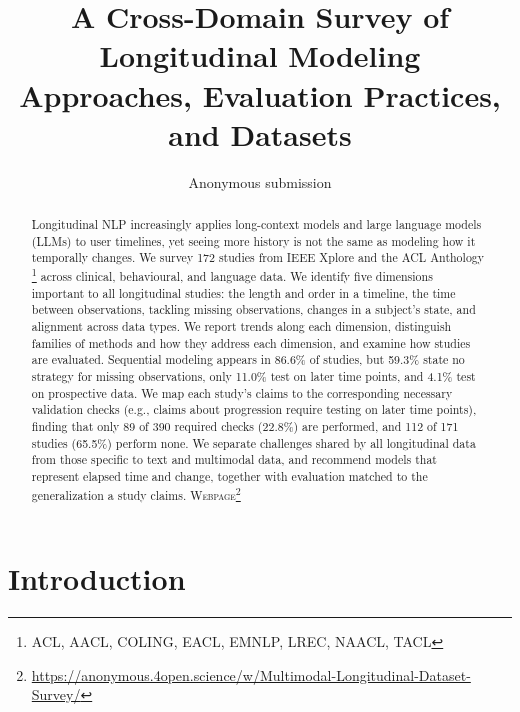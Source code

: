 \documentclass[11pt]{article}
\title{A Cross-Domain Survey of Longitudinal Modeling Approaches, Evaluation Practices, and Datasets}
\author{Anonymous submission}
\theoremstyle{plain}
\theoremstyle{definition}
\theoremstyle{remark}
\begin{document}
\maketitle
\begin{abstract}
Longitudinal NLP increasingly applies long-context models and large language models (LLMs) to user timelines, yet seeing more history is not the same as modeling how it temporally changes. We survey 172 studies from IEEE Xplore and the ACL Anthology \footnote{\small ACL, AACL, COLING, EACL, EMNLP, LREC, NAACL, TACL} across clinical, behavioural, and language data. We identify five dimensions important to all longitudinal studies: the length and order in a timeline, the time between observations, tackling missing observations, changes in a subject's state, and alignment across data types. We report trends along each dimension, distinguish families of methods and how they address each dimension, and examine how studies are evaluated. Sequential modeling appears in 86.6\% of studies, but 59.3\% state no strategy for missing observations, only 11.0\% test on later time points, and 4.1\% test on prospective data. We map each study's claims to the corresponding necessary validation checks (e.g., claims about progression require testing on later time points), finding that only 89 of 390 required checks (22.8\%) are performed, and 112 of 171 studies (65.5\%) perform none. We separate challenges shared by all longitudinal data from those specific to text and multimodal data, and recommend models that represent elapsed time and change, together with evaluation matched to the generalization a study claims. \textsc{Webpage}\footnote{\url{https://anonymous.4open.science/w/Multimodal-Longitudinal-Dataset-Survey/}}
\end{abstract}

\section{Introduction}
\label{sec:introduction}
\end{document}
